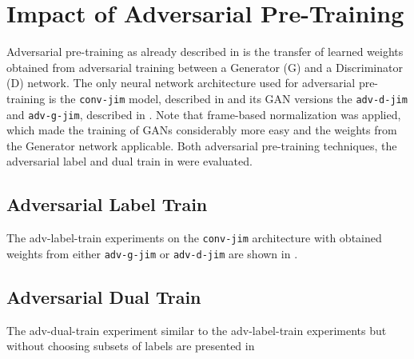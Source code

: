 
\section{Impact of Adversarial Pre-Training}\label{sec:exp_adv}
\thesisStateNotReady
Adversarial pre-training as already described in  is the transfer of learned weights obtained from adversarial training between a Generator (G) and a Discriminator (D) network.
The only neural network architecture used for adversarial pre-training is the \texttt{conv-jim} model, described in  and its GAN versions the \texttt{adv-d-jim} and \texttt{adv-g-jim}, described in .
Note that frame-based normalization was applied, which made the training of GANs considerably more easy and the weights from the Generator network applicable.
Both adversarial pre-training techniques, the adversarial label and dual train in  were evaluated.



\subsection{Adversarial Label Train}
The adv-label-train experiments on the \texttt{conv-jim} architecture with obtained weights from either \texttt{adv-g-jim} or \texttt{adv-d-jim} are shown in .




\subsection{Adversarial Dual Train}
The adv-dual-train experiment similar to the adv-label-train experiments but without choosing subsets of labels are presented in 



